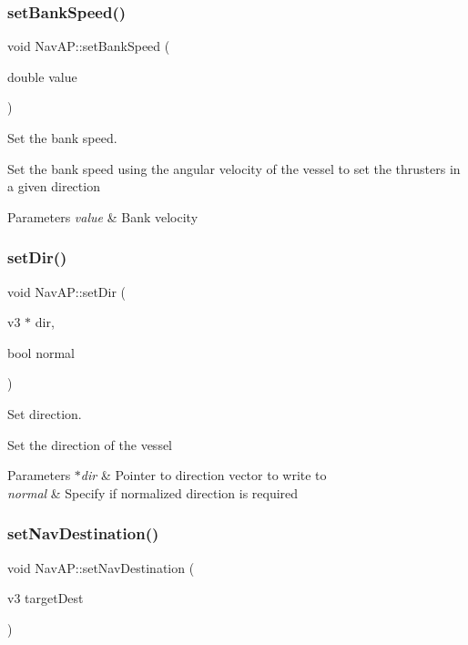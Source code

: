 \subsubsection{\texorpdfstring{set\+Bank\+Speed()}{setBankSpeed()}}
{\footnotesize\ttfamily void Nav\+A\+P\+::set\+Bank\+Speed (\begin{DoxyParamCaption}\item[{double}]{value }\end{DoxyParamCaption})\hspace{0.3cm}{\ttfamily [private]}}



Set the bank speed. 

Set the bank speed using the angular velocity of the vessel to set the thrusters in a given direction 
\begin{DoxyParams}{Parameters}
{\em value} & Bank velocity \\
\hline
\end{DoxyParams}
\mbox{\label{classNavAP_a1d6a18580cbdbb3b9c61a18b4cfee337}} 
\subsubsection{\texorpdfstring{set\+Dir()}{setDir()}}
{\footnotesize\ttfamily void Nav\+A\+P\+::set\+Dir (\begin{DoxyParamCaption}\item[{v3 $\ast$}]{dir,  }\item[{bool}]{normal }\end{DoxyParamCaption})\hspace{0.3cm}{\ttfamily [private]}}



Set direction. 

Set the direction of the vessel 
\begin{DoxyParams}{Parameters}
{\em $\ast$dir} & Pointer to direction vector to write to \\
\hline
{\em normal} & Specify if normalized direction is required \\
\hline
\end{DoxyParams}
\mbox{\label{classNavAP_a08d3e9dd6da93b1b8fdc8e4eb8db25f8}} 
\subsubsection{\texorpdfstring{set\+Nav\+Destination()}{setNavDestination()}}
{\footnotesize\ttfamily void Nav\+A\+P\+::set\+Nav\+Destination (\begin{DoxyParamCaption}\item[{v3}]{target\+Dest }\end{DoxyParamCaption})\hspace{0.3cm}{\ttfamily [private]}}



